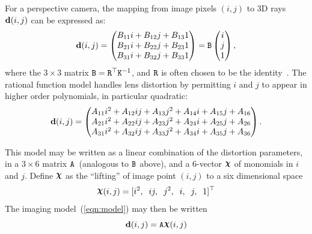 \documentclass[extendedabs]{bmvc2k}
\begin{document}
\newcommand{\tr}{^{\top}}
\newcommand{\matx}[1]{\mbox{\tt #1}}
\newcommand{\vect}[1]{{\bf #1}}
For a perspective camera, the mapping from image pixels $(i,j)$ to 3D rays
$\vect d(i,j)$ can be expressed as:
\begin{equation}
\vect d(i,j) = \begin{pmatrix}
B_{11} i   + B_{12}  j + B_{13} 1\\
B_{21} i   + B_{22}  j + B_{23} 1\\
B_{31} i   + B_{32}  j + B_{33} 1
\end{pmatrix}
= \matx B \begin{pmatrix}i\\j\\1\end{pmatrix}, \label{eqn:pinhole}
\end{equation}
where the $3\times3$ matrix $\matx B = \matx R^\top \matx K^{-1}$, and
$\matx R$ is often chosen to be the identity~\cite{Hartley00}.  The
rational function model handles lens distortion by permitting
$i$ and $j$ to appear in higher order polynomials, in particular
quadratic:
\begin{equation}
\vect d(i,j) = \begin{pmatrix}
A_{11} i^2 + A_{12} ij + A_{13} j^2 + A_{14} i + A_{15} j + A_{16}\\
A_{21} i^2 + A_{22} ij + A_{23} j^2 + A_{24} i + A_{25} j + A_{26}\\
A_{31} i^2 + A_{32} ij + A_{33} j^2 + A_{34} i + A_{35} j + A_{36}
           \end{pmatrix}.
           \label{eqn:model}
\end{equation}

\newcommand{\A}{\mbox{${\tt A}$}}
\newcommand{\Chi}{\raisebox{.4ex}{$\boldsymbol\chi$}}
This model may be written as a linear combination of the distortion
parameters, in a $3\times6$ matrix \A\ (analogous to $\matx B$
above), and a 6-vector $\Chi$ of monomials in $i$ and $j$.  Define
$\Chi$ as the ``lifting'' of image point $(i,j)$ to a six
dimensional space
\begin{equation}
\Chi(i,j) =
[i^2,\;\;ij,\;\;j^2,\;\;i,\;\;j,\;\;1]^{\top}\label{eqn:Chi}
\end{equation}
The imaging model~(\ref{eqn:model}) may then be written
\begin{equation}
\vect d(i,j) = \A \Chi(i,j) \label{eqn:project}
\end{equation}
\end{document}
